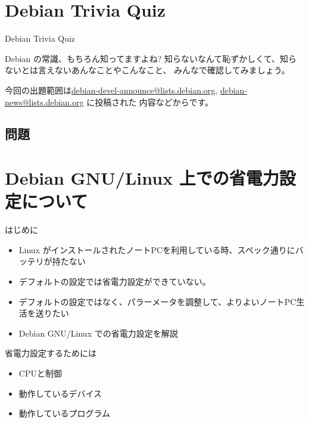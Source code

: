 \section{Debian Trivia Quiz}
\begin{frame}{Debian Trivia Quiz}

  Debian の常識、もちろん知ってますよね?
知らないなんて恥ずかしくて、知らないとは言えないあんなことやこんなこと、
みんなで確認してみましょう。

 今回の出題範囲は\url{debian-devel-announce@lists.debian.org},
\url{debian-news@lists.debian.org} に投稿された
内容などからです。

\end{frame}

\subsection{問題}



\section{Debian GNU/Linux 上での省電力設定について}

\begin{frame}{はじめに}

\begin{itemize}
\item Linux がインストールされたノートPCを利用している時、スペック通りにバッテリが持たない
\item デフォルトの設定では省電力設定ができていない。
\item デフォルトの設定ではなく、パラーメータを調整して、よりよいノートPC生活を送りたい
\item Debian GNU/Linux での省電力設定を解説
\end{itemize}

\end{frame}

\begin{frame}{省電力設定するためには}

\begin{itemize}
\item CPUと制御
\item 動作しているデバイス
\item 動作しているプログラム
\end{itemize}
\end{frame}

